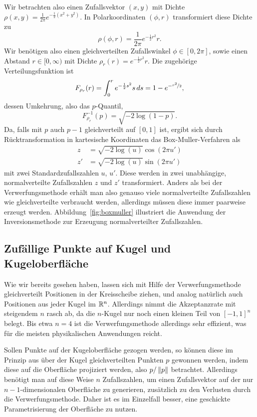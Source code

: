 Wir betrachten also einen Zufallsvektor $(x, y)$ mit Dichte $\rho(x,
y) = \frac{1}{2\pi}e^{-\frac{1}{2}(x^2 + y^2)}$. In Polarkoordinaten
$(\phi,r)$ transformiert diese Dichte zu
\begin{equation}
  \rho(\phi, r) = \frac{1}{2\pi}e^{-\frac{1}{2}r^2} r.
\end{equation}
Wir benötigen also einen gleichverteilten Zufallswinkel $\phi\in
[0,2\pi]$, sowie einen Abstand $r\in [0,\infty)$ mit Dichte $\rho_r(r)
= e^{-\frac{1}{2}r^2} r$. Die zugehörige Verteilungsfunktion ist
\begin{equation}
  F_{\rho_r}(r) = \int_0^r e^{-\frac{1}{2}s^2} s\, ds = 1 - e^{-\nicefrac{r^2}{2}},
\end{equation}
dessen Umkehrung, also das $p$-Quantil,
\begin{equation}
  \label{eq:expquantil}
  F_{\rho_r}^{-1}(p) = \sqrt{-2\log(1 - p)}.
\end{equation}
Da, falls mit $p$ auch $p-1$ gleichverteilt auf $[0,1]$ ist, ergibt
sich durch Rücktransformation in kartesische Koordinaten das
Box-Muller-Verfahren als
\begin{align}
  z  &= \sqrt{-2\log(u)}\cos(2\pi u')\\
  z' &= \sqrt{-2\log(u)}\sin(2\pi u')
\end{align}
mit zwei Standardzufallszahlen $u$, $u'$. Diese werden in zwei
unabhängige, normalverteilte Zufallszahlen $z$ und $z'$
transformiert. Anders als bei der Verwerfungsmethode erhält man also
genauso viele normalverteilte Zufallszahlen wie gleichverteilte
verbraucht werden, allerdings müssen diese immer paarweise erzeugt
werden. Abbildung~\ref{fig:boxmuller} illustriert die Anwendung der
Inversionsmethode zur Erzeugung normalverteilter Zufallszahlen.

\subsection{Zufällige Punkte auf Kugel und Kugeloberfläche}

Wie wir bereits gesehen haben, lassen sich mit Hilfe der
Verwerfungsmethode gleichverteilt Positionen in der Kreisscheibe
ziehen, und analog natürlich auch Positionen aus jeder Kugel im
$\mathbb{R}^n$. Allerdings nimmt die Akzeptanzrate mit steigendem $n$ rasch
ab, da die $n$-Kugel nur noch einen kleinen Teil von $[-1,1]^n$
belegt. Bis etwa $n=4$ ist die Verwerfungsmethode allerdings sehr
effizient, was für die meisten physikalischen Anwendungen reicht.

Sollen Punkte auf der Kugeloberfläche gezogen werden, so können diese
im Prinzip aus über der Kugel gleichverteilten Punkten $p$ gewonnen
werden, indem diese auf die Oberfläche projiziert werden, also
$p/\left\lVert{p}\right\rVert$ betrachtet. Allerdings benötigt man auf diese Weise $n$
Zufallszahlen, um einen Zufallsvektor auf der nur $n-1$-dimensionalen
Oberfläche zu generieren, zusätzlich zu den Verlusten durch die
Verwerfungsmethode. Daher ist es im Einzelfall besser, eine geschickte
Parametrisierung der Oberfläche zu nutzen.

